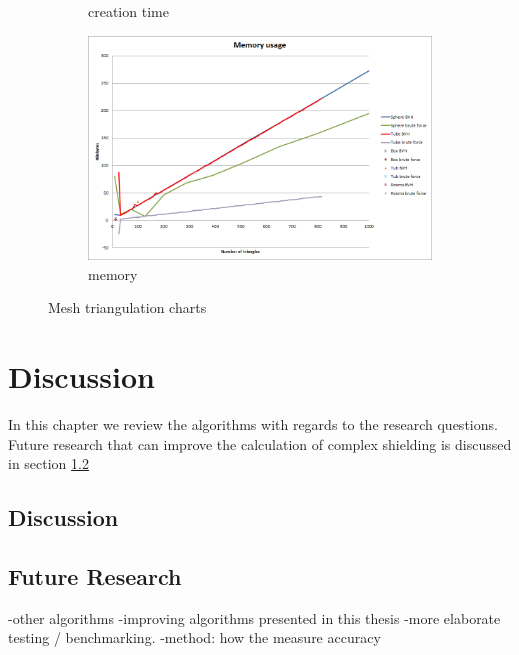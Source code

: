 \documentclass[11pt,twoside,a4paper]{report}
\begin{document}
\begin{figure}[h]
\begin{subfigure}[h]{0.49\textwidth}
    \caption{creation time} \label{fig:sphere creation time} \end{subfigure}
	\begin{subfigure}[h]{0.49\textwidth} 
	\includegraphics[width=\textwidth]{images/chart_triangulation_memory}
	\caption{memory} \label{fig:sphere creation memory} \end{subfigure}
    \caption{Mesh triangulation charts}\label{fig:triangulate benchmark charts}
\end{figure}

\chapter{Discussion}
\label{chapter:Discussion and Future Research}
In this chapter we review the algorithms with regards to the research questions. Future research that can improve the calculation of complex shielding is discussed in section \ref{section:Future Research}

\section{Discussion}

\section{Future Research}
\label{section:Future Research}

-other algorithms
-improving algorithms presented in this thesis
-more elaborate testing / benchmarking.
-method: how the measure accuracy
\end{document}
